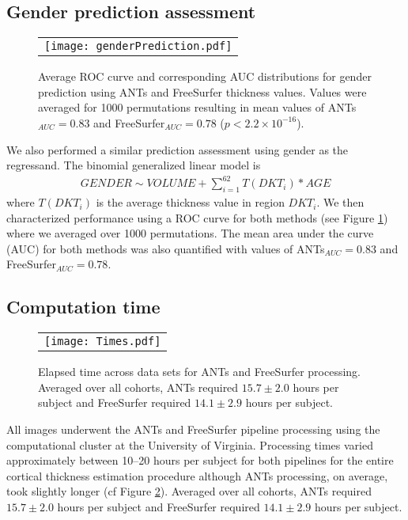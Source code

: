 \subsection{Gender prediction assessment}

\begin{figure}[htb]
  \centering
  \begin{tabular}{c}
  \texttt{[image: genderPrediction.pdf]}
  \end{tabular}
  \caption{Average ROC curve and corresponding AUC distributions
  for gender prediction using ANTs and FreeSurfer thickness values.
  Values were averaged for 1000 permutations resulting in mean
  values of ANTs$_{AUC} =0.83$ and FreeSurfer$_{AUC} =0.78$
  ($p < 2.2\times10^{-16}$).
  }
  \label{fig:genderPrediction}
\end{figure}

We also performed a similar prediction assessment using gender
as the regressand.   The binomial generalized linear model is
\begin{align}
  GENDER \sim VOLUME + \sum_{i=1}^{62} T(DKT_{i})*AGE
\end{align}
where $T(DKT_{i})$ is the average thickness value in region $DKT_{i}$.
We then characterized performance using a ROC curve for both methods 
(see Figure \ref{fig:genderPrediction}) where we averaged over 1000
permutations.  The mean area under the curve (AUC) for
both methods was also quantified with values of ANTs$_{AUC} =0.83$ and 
FreeSurfer$_{AUC} =0.78$.

   

\subsection{Computation time}

\begin{figure}[htb]
  \centering
  \begin{tabular}{c}
  \texttt{[image: Times.pdf]}
  \end{tabular}
  \caption{Elapsed time across data sets for ANTs and 
           FreeSurfer processing.  Averaged over all cohorts, ANTs required $15.7 \pm 2.0$ hours per subject and FreeSurfer required $14.1 \pm 2.9$ hours per subject.
           }
  \label{fig:times}
\end{figure}

All images underwent the ANTs and FreeSurfer pipeline processing 
using the computational cluster at the University of Virginia.  
Processing times varied approximately between 10--20 hours per subject
for both pipelines for the entire cortical thickness estimation procedure
although ANTs processing, on average, took slightly longer (cf Figure \ref{fig:times}).  Averaged over all cohorts, ANTs required 
$15.7 \pm 2.0 $ hours per subject and FreeSurfer required $14.1 \pm 2.9$ hours per subject.

